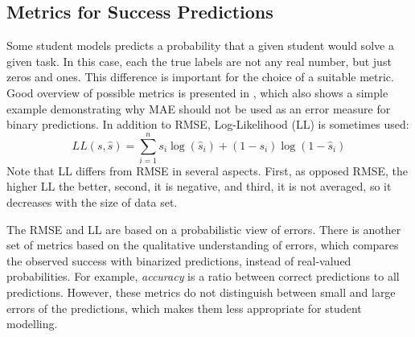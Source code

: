 


\subsection{Metrics for Success Predictions}
\label{sec:metrics-for-success-predictions}

Some student models predicts a probability that
  a given student would solve a given task.
In this case, each the true labels are not any real number,
  but just zeros and ones.
This difference is important for the choice of a suitable metric.
Good overview of possible metrics is presented in \cite{pelanek-evaluation-student-models},
  which also shows a simple example demonstrating why MAE should not be used
  as an error measure for binary predictions.
In addition to RMSE, Log-Likelihood (LL) is sometimes used:
$$
LL(s, \hat{s}) = \sum_{i=1}^n s_i\log(\hat{s}_i) + (1-s_i)\log(1-\hat{s}_i)
$$
Note that LL differs from RMSE in several aspects.
First, as opposed RMSE, the higher LL the better,
second, it is negative,
and third, it is not averaged, so it decreases with the size of data set.

The RMSE and LL are based on a probabilistic view of errors.
There is another set of metrics based on the qualitative understanding of errors,
  which compares the observed success with binarized predictions,
  instead of real-valued probabilities.
For example, \emph{accuracy} is a ratio between correct predictions to all predictions.
However, these metrics do not distinguish between small and large errors of the predictions,
  which makes them less appropriate for student modelling.


